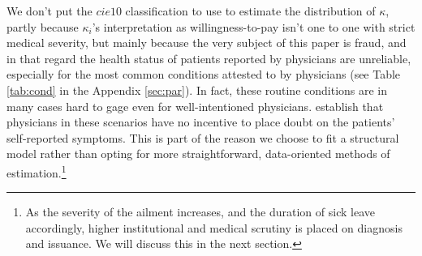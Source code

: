 \documentclass[../main.tex]{subfiles}
\begin{document}
We don't put the $cie10$ classification to use to estimate the distribution of $\kappa$, partly because $\kappa_i$'s interpretation as willingness-to-pay isn't one to one with strict medical severity, but mainly because the very subject of this paper is fraud, and in that regard the health status of patients reported by physicians are unreliable, especially for the most common conditions attested to by physicians (see Table \ref{tab:cond} in the Appendix \ref{sec:par}). In fact, these routine conditions are in many cases hard to gage even for well-intentioned physicians. \cite{cln} establish that physicians in these scenarios have no incentive to place doubt on the patients' self-reported symptoms. This is part of the reason we choose to fit a structural model rather than opting for more straightforward, data-oriented methods of estimation.\footnote{As the severity of the ailment increases, and the duration of sick leave accordingly, higher institutional and medical scrutiny is placed on diagnosis and issuance. We will discuss this in the next section.}
\end{document}
